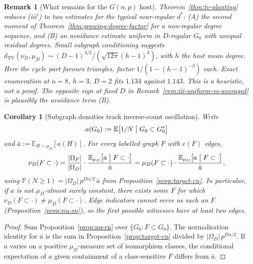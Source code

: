 \documentclass[11pt]{article}
\newtheorem{corollary}[theorem]{Corollary}
\newtheorem{remark}[theorem]{Remark}
\newcommand{\EE}{\mathbb{E}}
\newcommand{\PP}{\mathbb{P}}
\newcommand{\dTV}{d_{\mathrm{TV}}}
\begin{document}
\begin{remark}[What remains for the \(G(n,p)\) host]
\label{rem:tv-open}
Theorem~\ref{thm:tv-planting} reduces (iii\('\)) to two estimates for the typical
near-regular \(d^*\): (A) the second moment of
Theorem~\ref{thm:growing-degree-factor} for a non-regular degree sequence, and (B)
an avoidance estimate uniform in \(D\)-regular \(G_0\) with unequal residual
degrees. Small subgraph conditioning suggests
\(\dTV(\nu_D,\mu_D)\sim(D-1)^{3/2}/(\sqrt{12\pi}(h-1)^3)\), with \(h\) the host mean
degree. Here the cycle part favours triangles, factor \(1/(1-(h-1)^{-3})\) each.
Exact enumeration at \(n=8\), \(h=3\), \(D=2\) fits \(1.134\) against \(1.143\).
This is a heuristic, not a proof. The opposite sign at fixed \(D\) in
Remark~\ref{rem:iii-uniform-vs-averaged} is plausibly the avoidance term (B).
\end{remark}

\begin{corollary}[Subgraph densities track inverse-count oscillation]
\label{cor:subgraph-bias}
Write
\[
a(G_0)
:=
\EE\bigl[1/N\bigm|G_0\subset G^*_0\bigr]
\]
and \(\bar a:=\EE_{H\sim\mu_D}[a(H)]\).
For every labelled graph \(F\) with \(e(F)\) edges,
\[
\nu_D(F\subset\cdot)
=
\frac{\lvert\Omega_F\rvert}{\lvert\Omega_D\rvert}
\cdot
\frac{\EE_{\mu_D}\bigl[a\bigm|F\subset\cdot\bigr]}{\bar a}
=
\mu_D(F\subset\cdot)
\cdot
\frac{\EE_{\mu_D}\bigl[a\bigm|F\subset\cdot\bigr]}{\bar a},
\]
using \(\PP(N\ge 1)= \lvert\Omega_D\rvert\,p^{Dn/2}\,\bar a\) from
Proposition~\ref{prop:target-cn}.
In particular, if \(a\) is not \(\mu_D\)-almost surely constant, there exists some
\(F\) for which \(\nu_D(F\subset\cdot)\ne\mu_D(F\subset\cdot)\).
Edge indicators cannot serve as such an \(F\)
(Proposition~\ref{prop:nu-sn}), so the first possible witnesses have at least
two edges.
\end{corollary}

\begin{proof}
Sum Proposition~\ref{prop:nu-rn} over \(\{G_0:F\subset G_0\}\).
The normalisation identity for \(\bar a\) is the sum in
Proposition~\ref{prop:target-cn} divided by \(\lvert\Omega_D\rvert\,p^{Dn/2}\).
If \(a\) varies on a positive \(\mu_D\)-measure set of isomorphism classes, the
conditional expectation of \(a\) given containment of a class-sensitive \(F\)
differs from \(\bar a\).
\end{proof}
\end{document}
